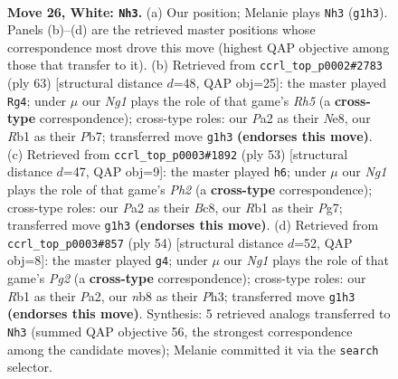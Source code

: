 \documentclass[11pt]{article}
\begin{document}
\clearpage

\begin{figure}[p]\centering
\begin{subfigure}{0.46\textwidth}\centering
\resizebox{\linewidth}{!}{%
\newchessgame
\chessboard[
  setfen={rn5r/8/7k/1B1p1p1p/p7/4K1P1/PP6/1R4N1 w - - 0 26},
  showmover=false,
  pgfstyle=straightmove, color=movearrow, markmove={g1-h3}
]}
\caption{}
\end{subfigure}\hfill
\begin{subfigure}{0.46\textwidth}\centering
\resizebox{\linewidth}{!}{%
\newchessgame
\chessboard[
  setfen={4n1k1/pp6/4P1p1/6P1/P1rp3r/1N1R4/1P6/1K1R4 b - - 0 32},
  showmover=false,
  pgfstyle=straightmove, color=movearrow, markmove={h4-g4}
]}
\caption{}
\end{subfigure}
\\[4pt]
\begin{subfigure}{0.46\textwidth}\centering
\resizebox{\linewidth}{!}{%
\newchessgame
\chessboard[
  setfen={2b5/5kpp/1Pp5/p1Pp4/P6P/1r6/5NP1/R5K1 b - - 0 27},
  showmover=false,
  pgfstyle=straightmove, color=movearrow, markmove={h7-h6}
]}
\caption{}
\end{subfigure}\hfill
\begin{subfigure}{0.46\textwidth}\centering
\resizebox{\linewidth}{!}{%
\newchessgame
\chessboard[
  setfen={r3k3/p1B5/4pb2/7p/1p6/7P/PP1R1KP1/8 w - - 0 28},
  showmover=false,
  pgfstyle=straightmove, color=movearrow, markmove={g2-g4}
]}
\caption{}
\end{subfigure}
\caption{\textbf{Move 26, White: \texttt{Nh3}.} (a) Our position; Melanie plays \texttt{Nh3} (\texttt{g1h3}). Panels (b)--(d) are the retrieved master positions whose correspondence most drove this move (highest QAP objective among those that transfer to it). (b) Retrieved from \texttt{ccrl\_top\_p0002\#2783} (ply 63) [structural distance $d$=48, QAP obj=25]: the master played \texttt{Rg4}; under $\mu$ our \emph{Ng1} plays the role of that game's \emph{Rh5} (a \textbf{cross-type} correspondence); cross-type roles: our \emph{P}a2 as their \emph{N}e8, our \emph{R}b1 as their \emph{P}b7; transferred move \texttt{g1h3} \textbf{(endorses this move)}. (c) Retrieved from \texttt{ccrl\_top\_p0003\#1892} (ply 53) [structural distance $d$=47, QAP obj=9]: the master played \texttt{h6}; under $\mu$ our \emph{Ng1} plays the role of that game's \emph{Ph2} (a \textbf{cross-type} correspondence); cross-type roles: our \emph{P}a2 as their \emph{B}c8, our \emph{R}b1 as their \emph{P}g7; transferred move \texttt{g1h3} \textbf{(endorses this move)}. (d) Retrieved from \texttt{ccrl\_top\_p0003\#857} (ply 54) [structural distance $d$=52, QAP obj=8]: the master played \texttt{g4}; under $\mu$ our \emph{Ng1} plays the role of that game's \emph{Pg2} (a \textbf{cross-type} correspondence); cross-type roles: our \emph{R}b1 as their \emph{P}a2, our \emph{n}b8 as their \emph{P}h3; transferred move \texttt{g1h3} \textbf{(endorses this move)}. Synthesis: 5 retrieved analogs transferred to \texttt{Nh3} (summed QAP objective 56, the strongest correspondence among the candidate moves); Melanie committed it via the \texttt{search} selector.}
\label{fig:thought-m50}
\end{figure}
\end{document}
